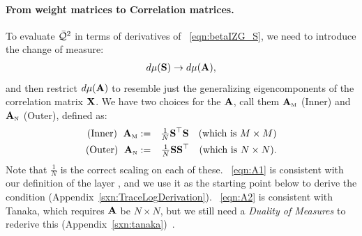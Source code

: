 \paragraph{From weight matrices to Correlation matrices.}
To evaluate $\bar{\mathcal{Q}}^{2}$ in terms of derivatives of \EQN~\ref{eqn:betaIZG_S}, we need to introduce the change of measure:
\begin{align}
  \label{eqn:changeOfMeasure}
  d\mu({\mathbf{S}})\rightarrow d\mu(\mathbf{A}) ,
\end{align}
and then restrict $d\mu(\mathbf{A})$ to resemble just the generalizing eigencomponents of the \Teacher correlation matrix $\mathbf{X}$.
%
We have two choices for the \Student \CorrelationMatrix $\mathbf{A}$, call them ${\mathbf{A}}_{\text{\tiny M}}$
(Inner) and ${\mathbf{A}}_{\text{\tiny N}}$ (Outer), defined as:
\begin{eqnarray}
  \label{eqn:A1}
 \textrm{(Inner) }\;{\mathbf{A}}_{\text{\tiny M}}&:=& \tfrac{1}{N}{\mathbf{S}}^{\top}{\mathbf{S}} \quad\mbox{(which is $M \times M$)} \\
  \label{eqn:A2}
 \textrm{(Outer) }\;{\mathbf{A}}_{\text{\tiny N}} &:=& \tfrac{1}{N}{\mathbf{S}}{\mathbf{S}}^{\top} \quad\mbox{(which is $N \times N$)} .
\end{eqnarray}
Note that $\frac{1}{N}$ is the correct scaling on each of these.
\EQN~\ref{eqn:A1} is consistent with our definition of the layer \CorrelationMatrix, and we use it as the starting point
below to derive the \VolumePreserving \TRACELOG condition (Appendix~\ref{sxn:TraceLogDerivation}).
\EQN~\ref{eqn:A2} is consistent with Tanaka, which requires $\mathbf{A}$ be $N\times N$, but
we still need a \emph{Duality of Measures} to rederive this (Appendix~\ref{sxn:tanaka})~\cite{Tanaka2007, Tanaka2008}.

